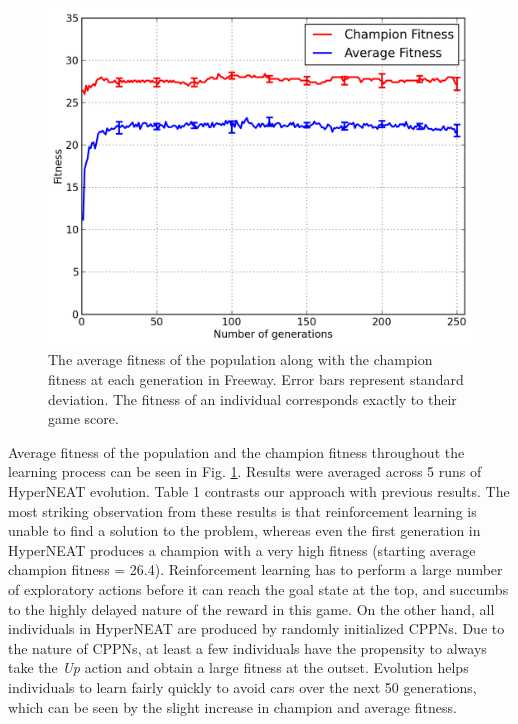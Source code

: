\documentclass{acm_proc_article-sp}
\begin{document}
\begin{figure}[ht]
\begin{center}
\includegraphics[width=\columnwidth]{figures/freeway-results.png}
\end{center}
\caption{The average fitness of the population along with the champion fitness at each generation in Freeway. Error bars represent standard deviation. The fitness of an individual corresponds exactly to their game score.}
\label{fig:freeway-curve}
\end{figure}


Average fitness of the population and the champion fitness throughout the learning process can be seen in Fig. \ref{fig:freeway-curve}. Results were averaged across 5 runs of HyperNEAT evolution. Table 1 contrasts our approach with previous results. The most striking observation from these results is that reinforcement learning is unable to find a solution to the problem, whereas even the first generation in HyperNEAT produces a champion with a very high fitness (starting average champion fitness = 26.4). Reinforcement learning has to perform a large number of exploratory actions before it can reach the goal state at the top, and succumbs to the highly delayed nature of the reward in this game. On the other hand, all individuals in HyperNEAT are produced by randomly initialized CPPNs. Due to the nature of CPPNs, at least a few individuals have the propensity to always take the \textit{Up} action and obtain a large fitness at the outset. Evolution helps individuals to learn fairly quickly to avoid cars over the next 50 generations, which can be seen by the slight increase in champion and average fitness.
\end{document}
